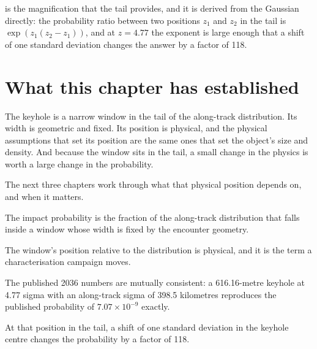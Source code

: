  is the magnification that the tail provides,
and it is derived from the Gaussian directly: the probability ratio between
two positions \(z_1\) and \(z_2\) in the tail is
\(\exp\left(z_{1}(z_{2}-z_{1})\right)\), and at \(z = 4.77\) the exponent is
large enough that a shift of one standard deviation changes the answer by a
factor of 118.

\section{What this chapter has established}

The keyhole is a narrow window in the tail of the along-track distribution.
Its width is geometric and fixed. Its position is physical, and the physical
assumptions that set its position are the same ones that set the object's
size and density. And because the window sits in the tail, a small change in
the physics is worth a large change in the probability.

The next three chapters work through what that physical position depends
on, and when it matters.

\begin{keytakeaways}
\item The impact probability is the fraction of the along-track distribution
that falls inside a window whose width is fixed by the encounter geometry.
\item The window's position relative to the distribution is physical, and it
is the term a characterisation campaign moves.
\item The published 2036 numbers are mutually consistent: a 616.16-metre
keyhole at 4.77 sigma with an along-track sigma of 398.5 kilometres
reproduces the published probability of \(7.07\times 10^{-9}\) exactly.
\item At that position in the tail, a shift of one standard deviation in the
keyhole centre changes the probability by a factor of 118.
\end{keytakeaways}
